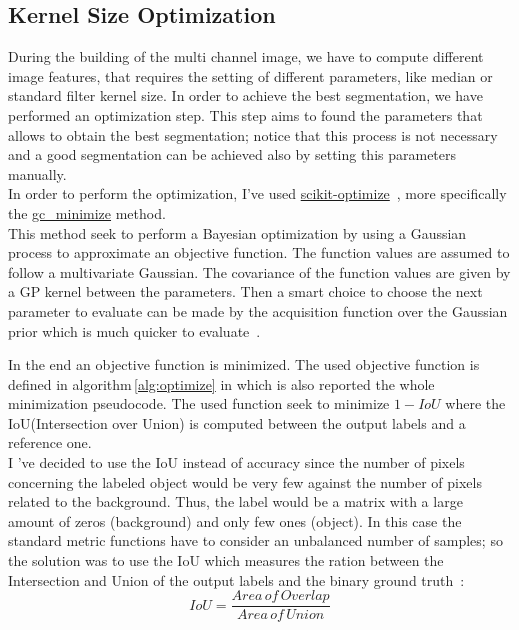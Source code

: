 \documentclass{standalone}
\begin{document}
	\subsection{Kernel Size Optimization}
	
	During the building of the multi channel image, we have to compute different image features, that requires the setting of different parameters, like median or standard filter kernel size. In order to achieve the best segmentation, we have performed an optimization step. This step aims to found the parameters that allows to obtain the best segmentation; notice that this process is not necessary and a good segmentation can be achieved also by setting this parameters manually.\\
	In order to perform the optimization, I've used \href{https://github.com/scikit-optimize}{scikit-optimize}~\cite{skopt}, more specifically the \href{https://scikit-optimize.github.io/stable/modules/generated/skopt.gp_minimize.html}{gc\_minimize} method.\\
	This method seek to perform a Bayesian optimization by using a Gaussian process to approximate an objective function. The function values are assumed to follow a multivariate Gaussian. The covariance of the function values are given by a GP kernel between the parameters. Then a smart choice to choose the next parameter to evaluate can be made by the acquisition function over the Gaussian prior which is much quicker to evaluate~\cite{skopt}.

	In the end an objective function is minimized. The used objective function is defined in algorithm\,\ref{alg:optimize} in which is also reported the whole minimization pseudocode. The used function seek to minimize $1 - IoU$ where the IoU(Intersection over Union) is computed between the output labels and a reference one.\\ I 've decided to use the IoU instead of accuracy since the number of pixels concerning the labeled object would be very few against the number of pixels related to the background. Thus, the label would be a matrix with a large amount of zeros (background) and only few ones (object). In this case the standard metric functions have to consider an unbalanced number of samples; so the solution was to use the IoU which  measures the ration between the Intersection and Union of the output labels and the binary ground truth~\cite{PhDtheis}:
	\begin{equation}
		IoU = \frac{Area\,of\,Overlap}{Area\,of\,Union}
	\end{equation}
	
\end{document}
